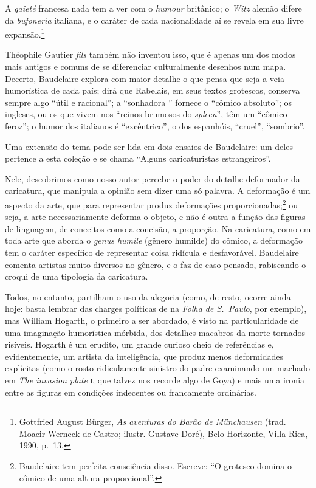 \begin{hedraquote}
A \textit{gaieté} francesa nada tem a ver com o \textit{humour}
britânico; o \textit{Witz} alemão difere da \textit{bufoneria}
italiana, e o caráter de cada nacionalidade aí se revela em sua livre
expansão.\footnote{ Gottfried August Bürger, \textit{As aventuras do
Barão de Münchausen} (trad. Moacir Werneck de Castro; ilustr. 
Gustave Doré), Belo Horizonte, Villa Rica, 1990, p.~13.}		
\end{hedraquote}

Théophile Gautier \textit{fils} também não inventou isso, que é apenas
um dos modos mais antigos e comuns de se diferenciar culturalmente
desenhos num mapa. Decerto, Baudelaire explora com maior detalhe o que
pensa que seja a veia humorística de cada país; dirá que Rabelais, em
seus textos grotescos, conserva sempre algo “útil e racional”; a
“sonhadora ” fornece o “cômico absoluto”; os ingleses, ou os
que vivem nos “reinos brumosos do \textit{spleen}”, têm um “cômico feroz”; o
humor dos italianos é “excêntrico”, o dos espanhóis, “cruel”,
“sombrio”.

Uma extensão do tema pode ser lida em dois ensaios de Baudelaire: um
deles pertence a esta coleção e se chama “Alguns caricaturistas
estrangeiros”.

Nele, descobrimos como nosso autor percebe o poder do detalhe deformador
da caricatura, que manipula a opinião sem dizer uma só palavra. A
deformação é um aspecto da arte, que para representar produz
deformações proporcionadas;\footnote{ Baudelaire tem perfeita
consciência disso. Escreve: “O grotesco domina o cômico de uma altura
proporcional”.} ou seja, a arte necessariamente deforma o objeto, e
não é outra a função das figuras de linguagem, de conceitos como a
concisão, a proporção. Na caricatura, como em toda arte que aborda o
\textit{genus humile} (gênero humilde) do cômico, a deformação tem o
caráter específico de representar coisa ridícula e desfavorável.
Baudelaire comenta artistas muito diversos no gênero, e o faz de caso
pensado, rabiscando o croqui de uma tipologia da caricatura.

Todos, no entanto, partilham o uso da alegoria (como, de resto, ocorre
ainda hoje: basta lembrar das charges políticas de  na
\textit{Folha de S.~Paulo}, por exemplo), mas William Hogarth, o
primeiro a ser abordado, é visto na particularidade de uma imaginação
humorística mórbida, dos detalhes macabros da morte tornados risíveis.
Hogarth é um erudito, um grande curioso cheio de referências e,
evidentemente, um artista da inteligência, que produz menos
deformidades explícitas (como o rosto ridiculamente sinistro do padre
examinando um machado em \textit{The invasion plate} \textsc{i}, que talvez nos
recorde algo de Goya) e mais uma ironia entre as figuras em condições
indecentes ou francamente ordinárias.

